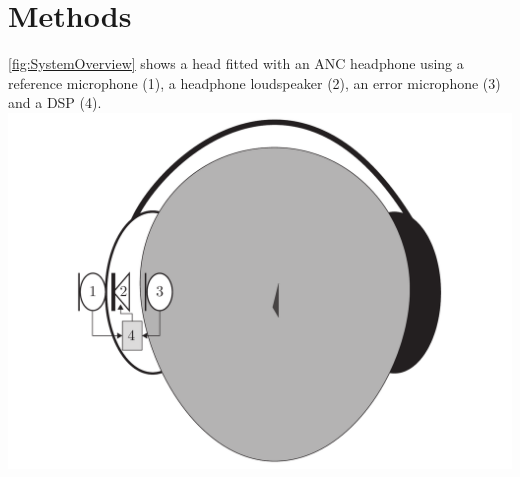 \section{Methods}
\autoref{fig:SystemOverview} shows a head fitted with an ANC headphone using a reference microphone (1), a headphone loudspeaker (2), an error microphone (3) and a DSP (4).
{
	\includegraphics[width=1\columnwidth]{figures/ArticleIllustrations/SystemOverview}
	\label{fig:SystemOverview}
}




